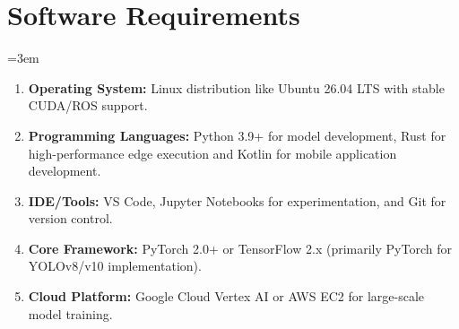 \section{Software Requirements}\label{sec:software}
\begingroup\emergencystretch=3em
  \begin{enumerate}[label=\roman*.]
    \item \textbf{Operating System:} Linux distribution like Ubuntu 26.04 LTS with stable CUDA/ROS
      support.
    \item \textbf{Programming Languages:} Python 3.9+ for model development, Rust for
      high-performance edge execution and Kotlin for mobile application development.
    \item \textbf{IDE/Tools:} VS Code, Jupyter Notebooks for experimentation, and Git for version
      control.
    \item \textbf{Core Framework:} PyTorch 2.0+ or TensorFlow 2.x (primarily PyTorch for YOLOv8/v10
      implementation).
    \item \textbf{Cloud Platform:} Google Cloud Vertex AI or AWS EC2 for large-scale model training.
  \end{enumerate}
\endgroup
\label{end:software}\label{end:requirements}
